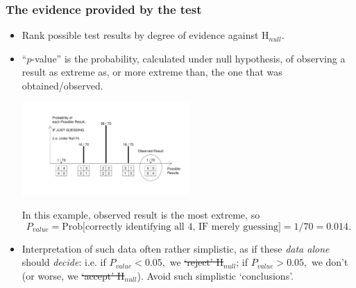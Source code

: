 \documentclass[10pt,handout]{beamer}\usepackage[]{graphicx}\usepackage[]{color}
\begin{document}
\begin{frame}
	\frametitle{The evidence provided by the test}
	
	\begin{footnotesize}
		\begin{itemize}
			\item
			Rank possible test
			results by  degree of evidence against H$_{null}$. 
			\item ``$p$-value'' is the probability, calculated under null hypothesis, of
			observing a result as  extreme as, or more extreme than, the one that was obtained/observed.
			\begin{center}
				\includegraphics[width=2.5in]{ProbResults.pdf}
			\end{center}
			\pause
			In this example, observed result is the most extreme, so
			$$P_{value}=\textrm{Prob[correctly identifying all 4, IF merely guessing]} = 1/70 = 0.014.$$ \pause
			\item
			Interpretation of such data  often  rather simplistic, as if these \textit{data alone} should \textit{decide}:  i.e. if $P_{value} < 0.05,$ we \sout{`reject' H}$_{null}$; if $P_{value} > 0.05,$ we don't (or worse, we \sout{`accept' H}$_{null}$). Avoid such simplistic `conclusions'.
			
		\end{itemize}
	\end{footnotesize}
\end{frame}
\end{document}
